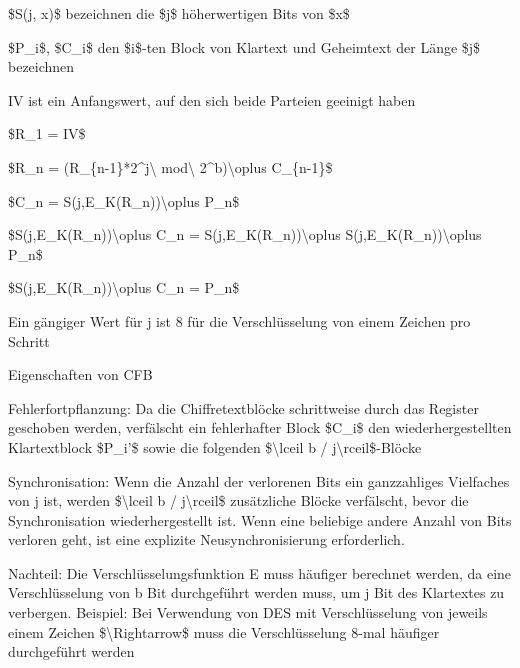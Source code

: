 \documentclass[a4paper]{article}
\begin{document}
\begin{multicols}{3}
\begin{itemize*}
            \begin{itemize*}
                  \item \$S(j, x)\$ bezeichnen die \$j\$ höherwertigen Bits von \$x\$
                  \item \$P\_i\$, \$C\_i\$ den \$i\$-ten Block von Klartext und Geheimtext der Länge \$j\$ bezeichnen
                  \item IV ist ein Anfangswert, auf den sich beide Parteien geeinigt haben
                  \item \$R\_1 = IV\$
                  \item \$R\_n = (R\_\{n-1\}*2\^{}j\textbackslash{} mod\textbackslash{} 2\^{}b)\textbackslash oplus C\_\{n-1\}\$
                  \item \$C\_n = S(j,E\_K(R\_n))\textbackslash oplus P\_n\$
                  \item \$S(j,E\_K(R\_n))\textbackslash oplus C\_n = S(j,E\_K(R\_n))\textbackslash oplus S(j,E\_K(R\_n))\textbackslash oplus P\_n\$
                  \item \$S(j,E\_K(R\_n))\textbackslash oplus C\_n = P\_n\$
            \end{itemize*}
            \item
            Ein gängiger Wert für j ist 8 für die Verschlüsselung von einem
            Zeichen pro Schritt
            \item
            Eigenschaften von CFB

            \begin{itemize*}
                  \item Fehlerfortpflanzung: Da die Chiffretextblöcke schrittweise durch das Register geschoben werden, verfälscht ein fehlerhafter Block \$C\_i\$ den wiederhergestellten Klartextblock \$P\_i'\$ sowie die folgenden \$\textbackslash lceil b / j\textbackslash rceil\$-Blöcke
                  \item Synchronisation: Wenn die Anzahl der verlorenen Bits ein ganzzahliges Vielfaches von j ist, werden \$\textbackslash lceil b / j\textbackslash rceil\$ zusätzliche Blöcke verfälscht, bevor die Synchronisation wiederhergestellt ist. Wenn eine beliebige andere Anzahl von Bits verloren geht, ist eine explizite Neusynchronisierung erforderlich.
                  \item Nachteil: Die Verschlüsselungsfunktion E muss häufiger berechnet werden, da eine Verschlüsselung von b Bit durchgeführt werden muss, um j Bit des Klartextes zu verbergen. Beispiel: Bei Verwendung von DES mit Verschlüsselung von jeweils einem Zeichen \$\textbackslash Rightarrow\$ muss die Verschlüsselung 8-mal häufiger durchgeführt werden
            \end{itemize*}
      \end{itemize*}


\end{multicols}
\end{document}
